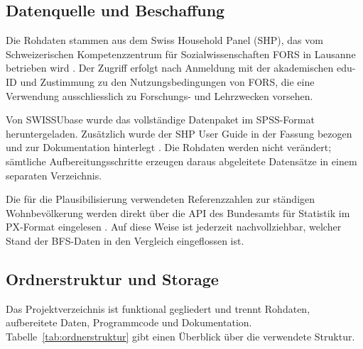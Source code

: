 \subsection{Datenquelle und Beschaffung}
\label{subsec:datenquelle}

Die Rohdaten stammen aus dem Swiss Household Panel (SHP), das vom Schweizerischen
Kompetenzzentrum für Sozialwissenschaften FORS in Lausanne betrieben wird
\cite{FORS2024}. Der Zugriff erfolgt nach Anmeldung mit der
akademischen edu-ID und Zustimmung zu den Nutzungsbedingungen von FORS, die eine
Verwendung ausschliesslich zu Forschungs- und Lehrzwecken vorsehen.

Von SWISSUbase wurde das vollständige Datenpaket im SPSS-Format heruntergeladen.
Zusätzlich wurde der SHP User Guide in der Fassung bezogen und zur Dokumentation
hinterlegt \cite{Voorpostel2018}. Die Rohdaten werden nicht verändert; sämtliche
Aufbereitungsschritte erzeugen daraus abgeleitete Datensätze in einem separaten
Verzeichnis.

Die für die Plausibilisierung verwendeten Referenzzahlen zur ständigen Wohnbevölkerung
werden direkt über die API des Bundesamts für Statistik im PX-Format eingelesen
\cite{BFS2023}. Auf diese Weise ist jederzeit nachvollziehbar, welcher Stand der
BFS-Daten in den Vergleich eingeflossen ist.

\subsection{Ordnerstruktur und Storage}
\label{subsec:ordnerstruktur}

Das Projektverzeichnis ist funktional gegliedert und trennt Rohdaten, aufbereitete
Daten, Programmcode und Dokumentation. Tabelle~\ref{tab:ordnerstruktur} gibt einen
Überblick über die verwendete Struktur.

